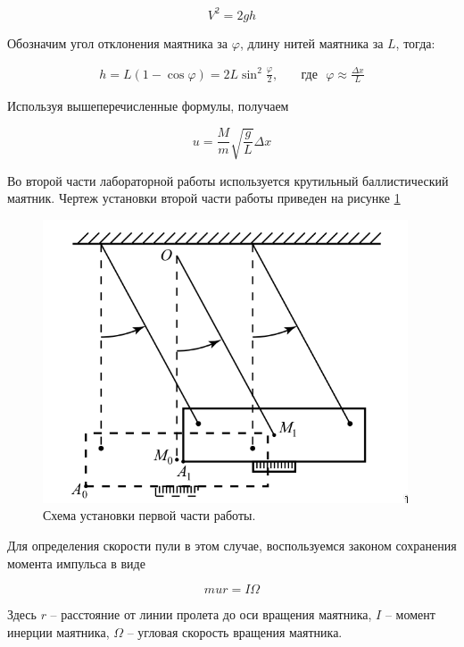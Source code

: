 \documentclass[a4paper, 12pt]{article}
\begin{document}
\begin{equation}
    V^2 = 2gh
\end{equation}

Обозначим угол отклонения маятника за $\varphi$, длину нитей маятника за $L$, тогда:

\begin{align}
    h = L \left(1 - \cos\varphi\right) = 2L\sin^2\frac{\varphi}{2}, & \text{~~~где~~} \varphi \approx \frac{\Delta x}{L}
\end{align}

Используя вышеперечисленные формулы, получаем

\begin{equation}
    u = \frac{M}{m}\sqrt{\frac{g}{L}}\Delta x
    \label{eq:speed_for_1}
\end{equation}


Во второй части лабораторной работы используется крутильный баллистический маятник. Чертеж установки второй части работы приведен на рисунке \ref{pic:pend2}

\begin{figure}[H]
    \centering
    \includegraphics[width=0.8\linewidth]{pendulum2.png}
    \caption{Схема установки первой части работы.}
    \label{pic:pend2}
\end{figure}

Для определения скорости пули в этом случае, воспользуемся законом сохранения момента импульса в виде 

\begin{equation}
    mur = I\Omega  
\end{equation}

Здесь $r$ -- расстояние от линии пролета до оси вращения маятника, $I$ -- момент инерции маятника, $\Omega$ -- угловая скорость вращения маятника.
\end{document}
